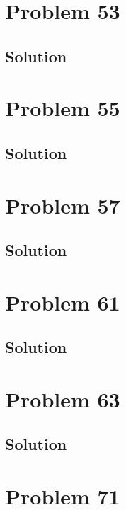 \documentclass[12pt]{article}
\begin{document}
    \pagebreak
    \section{Problem 53}

        \subsection{Solution}

    \pagebreak
    \section{Problem 55}

        \subsection{Solution}

    \pagebreak
    \section{Problem 57}

        \subsection{Solution}

    \pagebreak
    \section{Problem 61}

        \subsection{Solution}

    \pagebreak
    \section{Problem 63}

        \subsection{Solution}

    \pagebreak
    \section{Problem 71}
\end{document}
